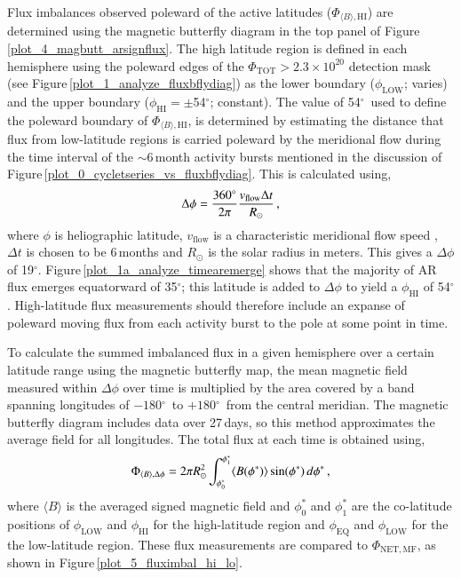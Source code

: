 \documentclass[namedreferences]{solarphysics}
\newcommand{\degr}{\ensuremath{^\circ}}
\begin{document}
\begin{article}
Flux imbalances observed poleward of the active latitudes ($\Phi_{\langle B \rangle,\mathrm{HI}}$) are determined using the magnetic butterfly diagram in the top panel of Figure\,\ref{plot_4_magbutt_arsignflux}. The high latitude region is defined in each hemisphere using the poleward edges of the $\Phi_{\mathrm{TOT}}>2.3\times10^{20}$ detection mask (see Figure\,\ref{plot_1_analyze_fluxbflydiag}) as the lower boundary ($\phi_\mathrm{LOW}$; varies) and the upper boundary ($\phi_\mathrm{HI}=$$\pm$54\degr; constant). The value of 54\degr\ used to define the poleward boundary of $\Phi_{\langle B \rangle,\mathrm{HI}}$, is determined by estimating the distance that flux from low-latitude regions is carried poleward by the meridional flow during the time interval of the $\sim$6\,month activity bursts mentioned in the discussion of Figure\,\ref{plot_0_cycletseries_vs_fluxbflydiag}. This is calculated using,
\begin{equation}
\Delta \phi = \frac{360^{\circ}}{2\pi} \frac{v_{\mathrm{flow}}\Delta t}{R_{\odot}} \mbox{\,,}
\end{equation}
where $\phi$ is heliographic latitude, $v_{\mathrm{flow}}$ is a characteristic meridional flow speed \citep[chosen to be 15\,m\,s$^{-1}$ from measurements in][]{Hathaway:2010}, $\Delta t$ is chosen to be 6\,months and $R_{\odot}$ is the solar radius in meters. This gives a $\Delta \phi$ of 19$^\circ$. Figure\,\ref{plot_1a_analyze_timearemerge} shows that the majority of AR flux emerges equatorward of 35$^{\circ}$; this latitude is added to $\Delta \phi$ to yield a $\phi_\mathrm{HI}$ of 54$^\circ$. 
High-latitude flux measurements should therefore include an expanse of poleward moving flux from each activity burst to the pole at some point in time.

To calculate the summed imbalanced flux in a given hemisphere over a certain latitude range using the magnetic butterfly map, the mean magnetic field measured within $\Delta \phi$ over time is multiplied by the area covered by a band spanning longitudes of $-180$\degr\ to $+180$\degr\ from the central meridian. The magnetic butterfly diagram includes data over 27\,days, so this method approximates the average field for all longitudes. The total flux at each time is obtained using,
\begin{equation}
\Phi_{\langle B \rangle,\Delta\phi}= 2\pi R_{\odot}^2 \int_{\phi^*_{0}}^{\phi^*_{1}} \langle B(\phi^*) \rangle \sin(\phi^*)\,d\phi^* \mbox{\,,} %
\end{equation}
where $\langle B \rangle$ is the averaged signed magnetic field and $\phi^*_{0}$ and $\phi^*_{1}$ are the co-latitude positions of $\phi_\mathrm{LOW}$ and $\phi_\mathrm{HI}$ for the high-latitude region and $\phi_\mathrm{EQ}$ and $\phi_\mathrm{LOW}$ for the the low-latitude region. These flux measurements are compared to $\Phi_{\mathrm{NET,MF}}$, as shown in Figure\,\ref{plot_5_fluximbal_hi_lo}.


\end{article}
\end{document}
